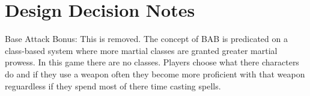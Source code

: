 \documentclass{article}
\begin{document}
\section{Design Decision Notes}
 
Base Attack Bonus: This is removed. The concept of BAB is predicated on a class-based system where more martial classes are granted greater martial prowess. In this game there are no classes. Players choose what there characters do and if they use a weapon often they become more proficient with that weapon reguardless if they spend most of there time casting spells.
 
 
 
\end{document}
